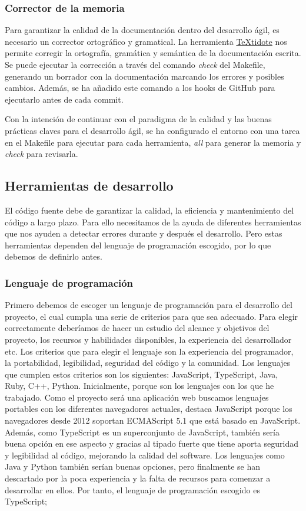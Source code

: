 \subsubsection{Corrector de la memoria}
Para garantizar la calidad de la documentación dentro del desarrollo ágil, es necesario un corrector ortográfico y gramatical.
La herramienta \href{https://github.com/sylvainhalle/textidote}{TeXtidote} nos permite corregir la ortografía, gramática y semántica de la documentación escrita.
Se puede ejecutar la corrección a través del comando \textit{check} del Makefile, generando un borrador con la documentación marcando los errores y posibles cambios.
Además, se ha añadido este comando a los hooks de GitHub para ejecutarlo antes de cada commit.

Con la intención de continuar con el paradigma de la calidad y las buenas prácticas claves para el desarrollo ágil, se ha configurado el entorno con
una tarea en el Makefile para ejecutar para cada herramienta, \textit{all} para generar la memoria y \textit{check} para revisarla.

\subsection{Herramientas de desarrollo}
El código fuente debe de garantizar la calidad, la eficiencia y mantenimiento del código a largo plazo. Para ello necesitamos de la ayuda de diferentes herramientas
que nos ayuden a detectar errores durante y después el desarrollo. Pero estas herramientas dependen del lenguaje de programación escogido, por lo que debemos de definirlo antes.

\subsubsection{Lenguaje de programación}
Primero debemos de escoger un lenguaje de programación para el desarrollo del proyecto, el cual cumpla una serie de criterios para que sea adecuado.
Para elegir correctamente deberíamos de hacer un estudio del alcance y objetivos del proyecto, los recursos y habilidades disponibles, la experiencia del desarrollador etc.
Los criterios que para elegir el lenguaje son la experiencia del programador, la portabilidad, legibilidad, seguridad del código y la comunidad.
Los lenguajes que cumplen estos criterios son los siguientes: JavaScript, TypeScript, Java, Ruby, C++, Python. Inicialmente, porque son los lenguajes con los que he trabajado.
Como el proyecto será una aplicación web buscamos lenguajes portables con los diferentes navegadores actuales, destaca JavaScript porque los navegadores desde 2012 soportan ECMAScript 5.1 que está basado en JavaScript.
Además, como TypeScript es un superconjunto de JavaScript, también sería buena opción en ese aspecto y gracias al tipado fuerte que tiene aporta seguridad y legibilidad al código, mejorando la calidad del software.
Los lenguajes como Java y Python también serían buenas opciones, pero finalmente se han descartado por la poca experiencia y la falta de recursos para comenzar a desarrollar en ellos.
Por tanto, el lenguaje de programación escogido es TypeScript;

